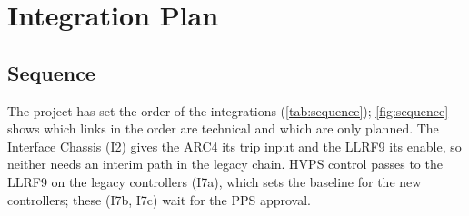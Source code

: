 \section{Integration Plan}\label{sec:plan}

\subsection{Sequence}\label{sec:sequence}

The project has set the order of the integrations (\cref{tab:sequence});
\cref{fig:sequence} shows which links in the order are technical and which are only
planned. The Interface Chassis (I2) gives the ARC4 its trip input and the LLRF9 its
enable, so neither needs an interim path in the legacy chain. HVPS control passes to
the LLRF9 on the legacy controllers (I7a), which sets the baseline for the new
controllers; these (I7b, I7c) wait for the PPS approval.

